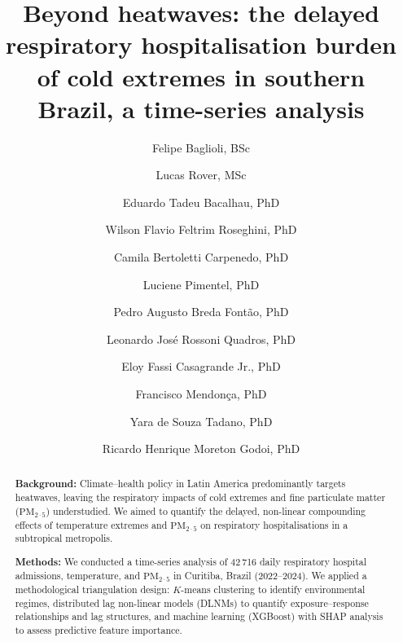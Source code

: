 \documentclass[review,number]{elsarticle}
\begin{document}
\begin{frontmatter}

\title{Beyond heatwaves: the delayed respiratory hospitalisation burden
       of cold extremes in southern Brazil, a time-series analysis}

\author[ufpr]{Felipe Baglioli, BSc}

\author[utfpr]{Lucas Rover, MSc}
\author[ufpr]{Eduardo Tadeu Bacalhau, PhD}
\author[ufpr]{Wilson Flavio Feltrim Roseghini, PhD}
\author[ufpr]{Camila Bertoletti Carpenedo, PhD}
\author[pucpr]{Luciene Pimentel, PhD}
\author[ufpr]{Pedro Augusto Breda Font\~{a}o, PhD}
\author[utfpr]{Leonardo Jos\'{e} Rossoni Quadros, PhD}
\author[utfpr]{Eloy Fassi Casagrande Jr., PhD}
\author[ufpr]{Francisco Mendon\c{c}a, PhD}
\author[utfpr]{Yara de Souza Tadano, PhD}
\author[ufpr]{Ricardo Henrique Moreton Godoi, PhD}

\address[ufpr]{Federal University of Paran\'{a} (UFPR), Curitiba, PR, Brazil}
\address[utfpr]{Federal University of Technology -- Paran\'{a} (UTFPR), Ponta Grossa, PR, Brazil}
\address[pucpr]{Pontifical Catholic University of Paran\'{a} (PUCPR), Curitiba, PR, Brazil}

\begin{abstract}

\textbf{Background:}\quad
Climate--health policy in Latin America predominantly targets
heatwaves, leaving the respiratory impacts of cold extremes and
fine particulate matter ($\text{PM}_{2{\cdot}5}$) understudied.
We aimed to quantify the delayed, non-linear compounding effects of
temperature extremes and $\text{PM}_{2{\cdot}5}$ on respiratory
hospitalisations in a subtropical metropolis.

\textbf{Methods:}\quad
We conducted a time-series analysis of 42\,716 daily respiratory
hospital admissions, temperature, and $\text{PM}_{2{\cdot}5}$ in Curitiba,
Brazil (2022--2024). We applied a methodological triangulation design:
$K$-means clustering to identify environmental regimes, distributed
lag non-linear models (DLNMs) to quantify exposure--response
relationships and lag structures, and machine learning (XGBoost) with
SHAP analysis to assess predictive feature importance.


\end{abstract}
\end{frontmatter}
\end{document}
